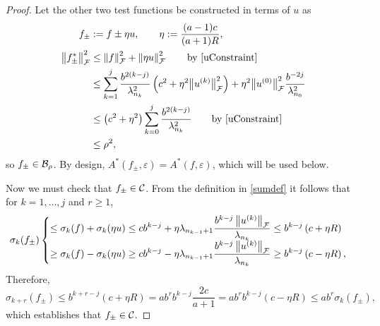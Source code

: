 \documentclass[final]{elsarticle}
\theoremstyle{definition}
\theoremstyle{remark}
\begin{document}
\begin{proof}
Let the other two test functions be constructed in terms of $u$ as 
\begin{align}
\label{etadef}
f_\pm & := f \pm \eta u, \qquad \eta : =  \frac {(a-1)c}{(a+1)R}, \\
\nonumber
\norm[\cf]{f^*_\pm}^2 & \le \norm[\cf]{f}^2 + \norm[\cf]{\eta u }^2 \qquad \text{by \eqref{uConstraint}} \\
& \le \sum_{k=1}^j \frac{ b^{2(k-j)}}{\lambda^2_{n_{k}}} \left(c^2+ \eta^2 \bignorm[\cf]{u^{(k)}}^2\right) + \eta^2 \bignorm[\cf]{u^{(0)}}^2 \frac{b^{-2j}}{\lambda_{n_0}^2}\\
\nonumber
& \le  \left(c^2+ \eta^2 \right) \sum_{k=0}^j \frac{ b^{2(k-j)}}{\lambda^2_{n_{k}}}  \qquad \text{by \eqref{uConstraint}}\\
&  \le \rho^2,
\end{align} 
so $f_{\pm} \in \cb_{\rho}$.  By design, $A^*(f_\pm,\varepsilon) = A^*(f,\varepsilon)$, which will be used below.

Now we must check that $f_\pm \in \cc$. From the definition in \eqref{sumdef} it follows that for $k = 1, \ldots, j$ and $r \ge 1$,
\begin{equation*}
\sigma_k(f_\pm)  \begin{cases} 
\displaystyle
\le \sigma_k(f) + \sigma_k(\eta u)\le 
c b^{k-j} + \eta\lambda_{n_{k-1}+1}\frac{b^{k-j}\norm[\cf]{u^{(k)} } }{\lambda_{n_k}}
\le b^{k-j}\left(c+\eta R \right) 
\\[1ex]
\displaystyle
\ge \sigma_k(f) - \sigma_k(\eta u)\ge 
c b^{k-j} - \eta\lambda_{n_{k-1}+1}\frac{b^{k-j}\norm[\cf]{u^{(k)} } }{\lambda_{n_k}}
\ge b^{k-j}\left(c-\eta R \right) , 
\end{cases}
\end{equation*}
Therefore, 
\begin{equation*}
\sigma_{k+r}(f_\pm)
\le b^{k+r-j}(c+\eta R) = ab^r b^{k-j}\frac{2c}{a+1}
=ab^r b^{k-j}\left(c-\eta R \right) \le a b^r \sigma_{k}(f_\pm),
\end{equation*}
which establishes that $f_\pm \in \cc$.


\end{proof}
\end{document}
